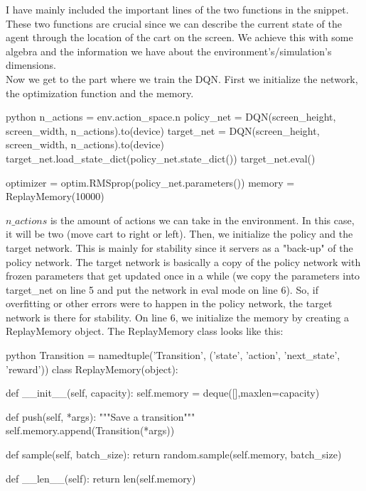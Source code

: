 \documentclass{article}
\numberwithin{equation}{section}
\numberwithin{equation}{section}
\begin{document}
I have mainly included the important lines of the two functions in the snippet. These two functions are crucial since we can describe the current state of the agent through the location of the cart on the screen. We achieve this with some algebra and the information we have about the environment's/simulation's dimensions. \\

Now we get to the part where we train the DQN.
First we initialize the network, the optimization function and the memory.

\begin{mintedbox}{python}
n_actions = env.action_space.n
policy_net = DQN(screen_height, screen_width, n_actions).to(device)
target_net = DQN(screen_height, screen_width, n_actions).to(device)
target_net.load_state_dict(policy_net.state_dict())
target_net.eval()

optimizer = optim.RMSprop(policy_net.parameters())
memory = ReplayMemory(10000)
\end{mintedbox}

$n\_actions$ is the amount of actions we can take in the environment. In this case, it will be two (move cart to right or left). Then, we initialize the policy and the target network. This is mainly for stability since it servers as a "back-up" of the policy network. The target network is basically a copy of the policy network with frozen parameters that get updated once in a while (we copy the parameters into target\_net on line 5 and put the network in eval mode on line 6). So, if overfitting or other errors were to happen in the policy network, the target network is there for stability. On line 6, we initialize the memory by creating a ReplayMemory object. The ReplayMemory class looks like this:

\begin{mintedbox}{python}
Transition = namedtuple('Transition',
                        ('state', 'action', 'next_state', 'reward'))
class ReplayMemory(object):

    def __init__(self, capacity):
        self.memory = deque([],maxlen=capacity)

    def push(self, *args):
        """Save a transition"""
        self.memory.append(Transition(*args))

    def sample(self, batch_size):
        return random.sample(self.memory, batch_size)

    def __len__(self):
        return len(self.memory)
\end{mintedbox}
\end{document}
